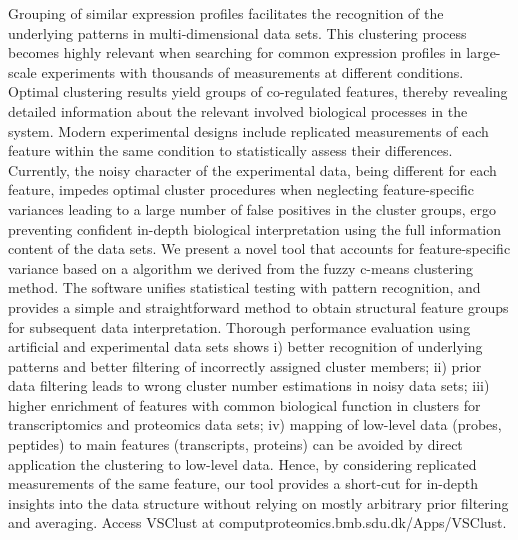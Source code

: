 Grouping of similar expression profiles facilitates the recognition of the underlying patterns in multi-dimensional data sets. This clustering process becomes highly relevant when searching for common expression profiles in large-scale experiments with thousands of measurements at different conditions. Optimal clustering results yield groups of co-regulated features, thereby revealing detailed information about the relevant involved biological processes in the system. Modern experimental designs include replicated measurements of each feature within the same condition to statistically assess their differences. Currently, the noisy character of the experimental data, being different for each feature, impedes optimal cluster procedures when neglecting feature-specific variances leading to a large number of false positives in the cluster groups, ergo preventing confident in-depth biological interpretation using the full information content of the data sets. We present a novel tool that accounts for feature-specific variance based on a algorithm we derived from the fuzzy c-means clustering method. The software unifies
statistical testing with pattern recognition, and provides a simple and straightforward method to obtain structural feature groups for subsequent data interpretation. Thorough performance evaluation using artificial and experimental data sets shows i) better recognition of underlying patterns and better filtering of incorrectly assigned cluster members; ii) prior data filtering leads to wrong cluster number estimations in noisy data sets;  iii) higher enrichment of features with common biological function in clusters for transcriptomics and proteomics data sets; iv) mapping of low-level data (probes, peptides) to main features (transcripts, proteins) can be avoided by direct application the clustering to low-level data. Hence, by considering replicated measurements of the same feature, our tool provides a short-cut for in-depth insights into the data structure without relying on mostly arbitrary prior filtering and averaging. Access VSClust at computproteomics.bmb.sdu.dk/Apps/VSClust.
